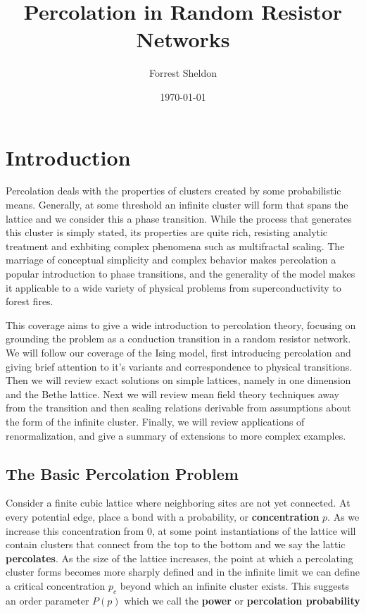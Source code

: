 
\title{Percolation in Random Resistor Networks}
\author{Forrest Sheldon}
\date{\today}

\maketitle

\section{Introduction}

Percolation deals with the properties of clusters created by some
probabilistic means. Generally, at some threshold an infinite cluster
will form that spans the lattice and we consider this a phase transition.
While the process that generates this cluster is simply stated, its properties
are quite rich, resisting analytic treatment and exhbiting complex phenomena
such as multifractal scaling. The marriage of conceptual simplicity and
complex behavior makes percolation a popular introduction to phase transitions,
and the generality of the model makes it applicable to a wide variety of physical
problems from superconductivity to forest fires.


This coverage aims to give a wide introduction to percolation theory, focusing
on grounding the problem as a conduction transition in a random resistor network.
We will follow our coverage of the Ising model, first introducing percolation and
giving brief attention to it's variants and correspondence to physical transitions.
Then we will
review exact solutions on simple lattices, namely in one dimension and the Bethe
lattice.  Next we will review mean field theory techniques away from the transition
and then scaling relations derivable from assumptions about the form of the
infinite cluster.  Finally, we will review applications of renormalization, and give
a summary of extensions to more complex examples.

\subsection{The Basic Percolation Problem}

Consider a finite cubic lattice where neighboring sites are not yet connected.
At every potential edge, place a bond with a probability, or \textbf{concentration}
$p$. As we increase this concentration from 0, at some point instantiations of the
lattice will contain clusters that connect from the top to the bottom and we say
the lattic \textbf{percolates}.  As the size of the lattice
increases, the point at which a percolating cluster forms becomes more sharply
defined and in the infinite limit we can define a critical concentration
$p_c$ beyond which an infinite cluster exists. This suggests an order parameter
$P(p)$ which we call the \textbf{power} or \textbf{percolation probability}


